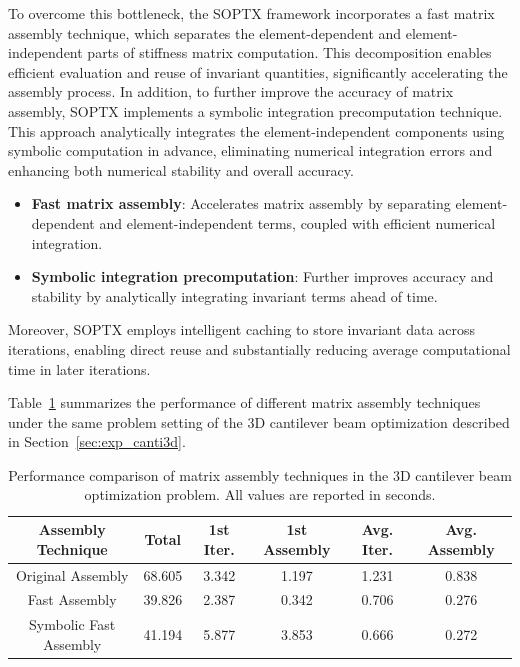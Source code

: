 \documentclass[mathpazo]{cicp}
\begin{document}
To overcome this bottleneck, the SOPTX framework incorporates a fast matrix assembly technique, which separates the element-dependent and element-independent parts of stiffness matrix computation. This decomposition enables efficient evaluation and reuse of invariant quantities, significantly accelerating the assembly process. In addition, to further improve the accuracy of matrix assembly, SOPTX implements a symbolic integration precomputation technique. This approach analytically integrates the element-independent components using symbolic computation in advance, eliminating numerical integration errors and enhancing both numerical stability and overall accuracy.
\begin{itemize} 
	\item \textbf{Fast matrix assembly}: Accelerates matrix assembly by separating element-dependent and element-independent terms, coupled with efficient numerical integration.
	\item \textbf{Symbolic integration precomputation}: Further improves accuracy and stability by analytically integrating invariant terms ahead of time.
\end{itemize}

Moreover, SOPTX employs intelligent caching to store invariant data across iterations, enabling direct reuse and substantially reducing average computational time in later iterations.

Table~\ref{tab:assembly_comparison} summarizes the performance of different matrix assembly techniques under the same problem setting of the 3D cantilever beam optimization described in Section~\ref{sec:exp_canti3d}.
\begin{table}[htbp]
	\centering
	\caption{Performance comparison of matrix assembly techniques in the 3D cantilever beam optimization problem. All values are reported in seconds.}
	\begin{tabular}{cccccc}
		\toprule
		\textbf{Assembly Technique} & \textbf{Total} & \textbf{1st Iter.} & \textbf{1st Assembly} & \textbf{Avg. Iter.} & \textbf{Avg. Assembly} \\
		\midrule
		Original Assembly & 68.605 & 3.342 & 1.197 & 1.231 & 0.838 \\
		Fast Assembly & 39.826 & 2.387 & 0.342 & 0.706 & 0.276 \\
		Symbolic Fast Assembly & 41.194 & 5.877 & 3.853 & 0.666 & 0.272 \\
		\bottomrule
	\end{tabular}
	\label{tab:assembly_comparison}
\end{table}
\end{document}
